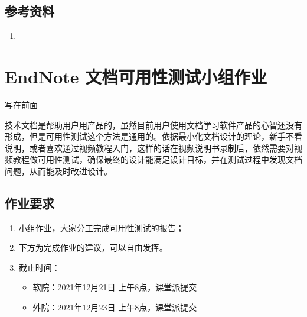 \documentclass[letterpaper,10pt,english]{sphinxmanual}
\begin{document}
\section{参考资料}
\label{\detokenize{content_test/usability_testing:id10}}\begin{enumerate}
%
\item {} 
\sphinxAtStartPar
{}

\end{enumerate}

\sphinxstepscope


\chapter{EndNote 文档可用性测试小组作业}
\label{\detokenize{capstone-project/endnote-doc-usability:endnote}}\label{\detokenize{capstone-project/endnote-doc-usability::doc}}
\sphinxAtStartPar
写在前面

\sphinxAtStartPar
技术文档是帮助用户用产品的，虽然目前用户使用文档学习软件产品的心智还没有形成，但是可用性测试这个方法是通用的。依据最小化文档设计的理论，新手不看说明，或者喜欢通过视频教程入门，这样的话在视频说明书录制后，依然需要对视频教程做可用性测试，确保最终的设计能满足设计目标，并在测试过程中发现文档问题，从而能及时改进设计。


\section{作业要求}
\label{\detokenize{capstone-project/endnote-doc-usability:id1}}\begin{enumerate}
%
\item {} 
\sphinxAtStartPar
小组作业，大家分工完成可用性测试的报告；

\item {} 
\sphinxAtStartPar
下方为完成作业的建议，可以自由发挥。

\item {} 
\sphinxAtStartPar
截止时间：
\begin{itemize}
\item {} 
\sphinxAtStartPar
软院：2021年12月21日 上午8点，课堂派提交

\item {} 
\sphinxAtStartPar
外院：2021年12月23日 上午8点，课堂派提交

\end{itemize}

\end{enumerate}
\end{document}
